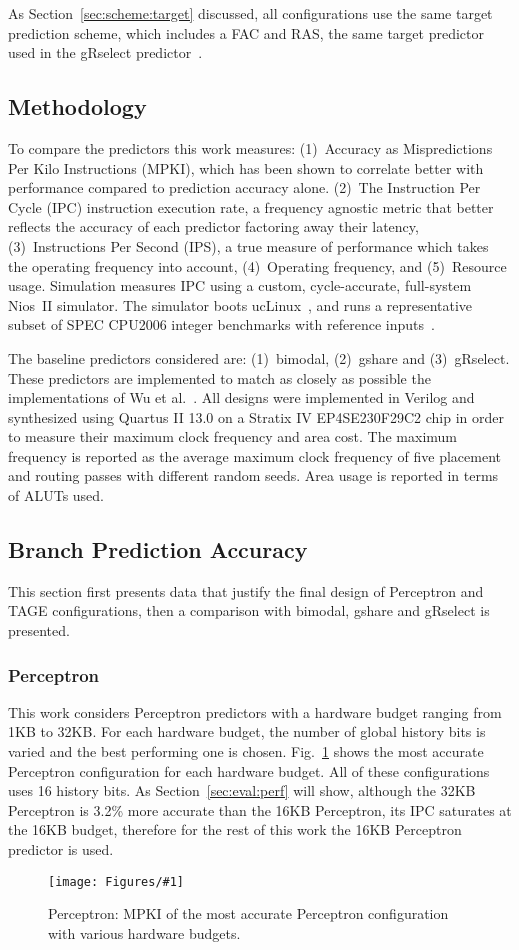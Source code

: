 \documentclass[conference]{IEEEtran}
\newcommand{\kfig}[4]{ %
        \begin{figure}[!t]
        \centering
        \texttt{[image: Figures/\#1]}
        \vspace{-1mm}
        \caption{#3}
        \label{#2}
        \end{figure}
}
\begin{document}
As Section~\ref{sec:scheme:target} discussed, all configurations use the same target prediction scheme, which includes a FAC and RAS, the same target predictor used in the gRselect predictor~\cite{grselect}.

\subsection{Methodology}
\label{sec:eval:methodology}
To compare the predictors this work measures: (1)~Accuracy as Mispredictions Per Kilo Instructions (MPKI), which has been shown to correlate better with performance compared to prediction accuracy alone. (2)~The Instruction Per Cycle (IPC) instruction execution rate, a frequency agnostic metric that better reflects the accuracy of each predictor factoring away their latency, (3)~Instructions Per Second (IPS), a true measure of performance which takes the operating frequency into account, (4)~Operating frequency, and (5)~Resource usage. Simulation measures IPC using a custom, cycle-accurate, full-system Nios~II simulator. The simulator boots ucLinux~\cite{uclinux}, and runs a representative subset of SPEC CPU2006 integer benchmarks with reference inputs~\cite{spec2k6}.

The baseline predictors considered are: (1)~bimodal, (2)~gshare and (3)~gRselect. These predictors are implemented to match as closely as possible the implementations of Wu et al.~\cite{grselect}. All designs were implemented in Verilog and synthesized using Quartus II 13.0 on a Stratix IV EP4SE230F29C2 chip in order to measure their maximum clock frequency and area cost. The maximum frequency is reported as the average maximum clock frequency of five placement and routing passes with different random seeds. Area usage is reported in terms of ALUTs used.

\subsection{Branch Prediction Accuracy}
\label{sec:eval:accuracy}
This section first presents data that justify the final design of Perceptron and TAGE configurations, then a comparison with bimodal, gshare and gRselect is presented.

\subsubsection{Perceptron}
\label{sec:eval:accuracy:perceptron}
This work considers Perceptron predictors with a hardware budget ranging from 1KB to 32KB. For each hardware budget, the number of global history bits is varied and the best performing one is chosen. Fig.~\ref{fig:perceptronMPKI} shows the most accurate Perceptron configuration for each hardware budget. All of these configurations uses 16 history bits. As Section~\ref{sec:eval:perf} will show, although the 32KB Perceptron is 3.2\% more accurate than the 16KB Perceptron, its IPC saturates at the 16KB budget, therefore for the rest of this work the 16KB Perceptron predictor is used.
\kfig{perceptronMPKI.pdf}{fig:perceptronMPKI}{Perceptron: MPKI of the most accurate Perceptron configuration with various hardware budgets.}{angle = 0, trim = 0.9in 2.7in 0.8in 2.7in, clip, width=0.35\textwidth}
\end{document}
